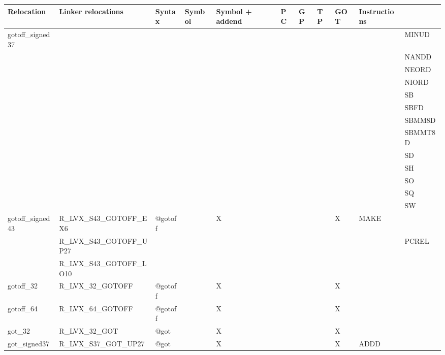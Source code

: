 {\tiny
\begin{tabular}{|l|l|l|l|l|l|l|l|l|l|l|} \hline
\textsf{Relocation} & \textsf{Linker relocations} & \textsf{Syntax} & \textsf{Symbol} & \textsf{Symbol + addend} & \textsf{PC} & \textsf{GP} & \textsf{TP} & \textsf{GOT} & \textsf{Instructions} \\
\hline
\textsf{gotoff\_signed37} & & & & & & & & & & \textsf{MINUD} \\
 & & & & & & & & & & \textsf{NANDD} \\
 & & & & & & & & & & \textsf{NEORD} \\
 & & & & & & & & & & \textsf{NIORD} \\
 & & & & & & & & & & \textsf{SB} \\
 & & & & & & & & & & \textsf{SBFD} \\
 & & & & & & & & & & \textsf{SBMM8D} \\
 & & & & & & & & & & \textsf{SBMMT8D} \\
 & & & & & & & & & & \textsf{SD} \\
 & & & & & & & & & & \textsf{SH} \\
 & & & & & & & & & & \textsf{SO} \\
 & & & & & & & & & & \textsf{SQ} \\
 & & & & & & & & & & \textsf{SW} \\
\hline
\textsf{gotoff\_signed43} & \textsf{R\_LVX\_S43\_GOTOFF\_EX6} & \textsf{@gotoff} & \textsf{} & \textsf{X} & \textsf{} & \textsf{} & \textsf{} & \textsf{X} & \textsf{MAKE} \\
 & \textsf{R\_LVX\_S43\_GOTOFF\_UP27} & & & & & & & & & \textsf{PCREL} \\
 & \textsf{R\_LVX\_S43\_GOTOFF\_LO10} & & & & & & & & & \\
\hline
\textsf{gotoff\_32} & \textsf{R\_LVX\_32\_GOTOFF} & \textsf{@gotoff} & \textsf{} & \textsf{X} & \textsf{} & \textsf{} & \textsf{} & \textsf{X} & \textsf{} \\
\hline
\textsf{gotoff\_64} & \textsf{R\_LVX\_64\_GOTOFF} & \textsf{@gotoff} & \textsf{} & \textsf{X} & \textsf{} & \textsf{} & \textsf{} & \textsf{X} & \textsf{} \\
\hline
\textsf{got\_32} & \textsf{R\_LVX\_32\_GOT} & \textsf{@got} & \textsf{} & \textsf{X} & \textsf{} & \textsf{} & \textsf{} & \textsf{X} & \textsf{} \\
\hline
\textsf{got\_signed37} & \textsf{R\_LVX\_S37\_GOT\_UP27} & \textsf{@got} & \textsf{} & \textsf{X} & \textsf{} & \textsf{} & \textsf{} & \textsf{X} & \textsf{ADDD} \\

\end{tabular}}
